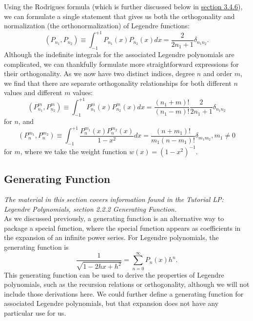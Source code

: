 \documentclass[11pt]{report}
\begin{document}
Using the Rodrigues formula (which is further discussed below in \hyperlink{subsection.3.4.6}{section 3.4.6}), we can formulate a single statement that gives us both the orthogonality and normalization (the orthonormalization) of Legendre functions:
    \begin{equation}
        (P_{n_1},P_{n_2}) \equiv \int_{-1}^{+1}P_{n_1}(x)P_{n_2}(x)dx = \frac{2}{2n_1+1}\delta_{n_1n_2}.
    \end{equation}
Although the indefinite integrals for the associated Legendre polynomials are complicated, we can thankfully formulate more straightforward expressions for their orthogonality. As we now have two distinct indices, degree $n$ and order $m$, we find that there are separate orthogonality relationships for both different $n$ values and different $m$ values:
    \begin{equation}
        (P_{n_1}^m,P_{n_2}^m) \equiv \int_{-1}^{+1}P_{n_1}^m(x)P_{n_2}^m(x)dx = \frac{(n_1+m)!}{(n_1-m)!}\frac{2}{2n_1+1}\delta_{n_1n_2}
    \end{equation}
for $n$, and
    \begin{equation}
        (P_n^{m_1},P_n^{m_2}) \equiv \int_{-1}^{+1}\frac{P_n^{m_1}(x)P_n^{m_2}(x)}{1-x^2}dx = \frac{(n+m_1)!}{m_1(n-m_1)!}\delta_{m_1m_2}, m_1\neq0
    \end{equation}
for $m$, where we take the weight function $w(x) = (1-x^2)^{-1}$.

\subsection{Generating Function}

\emph{The material in this section covers information found in the Tutorial LP: Legendre Polynomials, section 2.2.2 Generating Function.}\\

As we discussed previously, a generating function is an alternative way to package a special function, where the special function appears as coefficients in the expansion of an infinite power series. For Legendre polynomials, the generating function is
    \begin{equation}
        \frac{1}{\sqrt{1-2hx+h^2}} = \sum_{n=0}^\infty P_n(x)h^n.
    \end{equation}
This generating function can be used to derive the properties of Legendre polynomials, such as the recursion relations or orthogonality, although we will not include those derivations here. We could further define a generating function for associated Legendre polynomials, but that expansion does not have any particular use for us.\\
\end{document}
